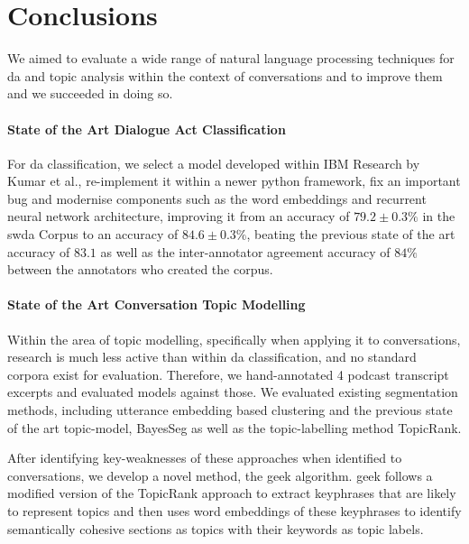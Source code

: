 \chapter{Conclusions}
We aimed to evaluate a wide range of natural language processing techniques for \gls{da} and topic analysis within the context of conversations and to improve them and we succeeded in doing so.
\subsubsection{State of the Art Dialogue Act Classification}
    For \gls{da} classification, we select a \gls{model} developed within IBM Research by Kumar et al.\cite{kumar2017dialogue}, re-implement it within a newer python framework, fix an important bug and modernise components such as the word \glspl{embedding} and recurrent neural network architecture, improving it from an accuracy of $79.2 \pm 0.3\%$ in the \gls{swda} Corpus to an accuracy of $84.6 \pm 0.3\%$, beating the previous state of the art accuracy of $83.1$ as well as the inter-annotator agreement accuracy of $84\%$ between the annotators who created the corpus.

\subsubsection{State of the Art Conversation Topic Modelling}
    Within the area of topic modelling, specifically when applying it to conversations, research is much less active than within \gls{da} classification, and no standard corpora exist for evaluation. Therefore, we hand-annotated 4 podcast transcript excerpts and evaluated \glspl{model} against those. We evaluated existing segmentation methods, including \gls{utterance} \gls{embedding} based clustering and the previous state of the art topic-\gls{model}, BayesSeg as well as the topic-labelling method TopicRank.
    
    After identifying key-weaknesses of these approaches when identified to conversations, we develop a novel method, the \gls{geek} algorithm.
    \gls{geek} follows a modified version of the TopicRank approach to extract \glspl{keyphrase} that are likely to represent topics and then uses word \glspl{embedding} of these \glspl{keyphrase} to identify semantically cohesive sections as topics with their keywords as topic labels.
    
